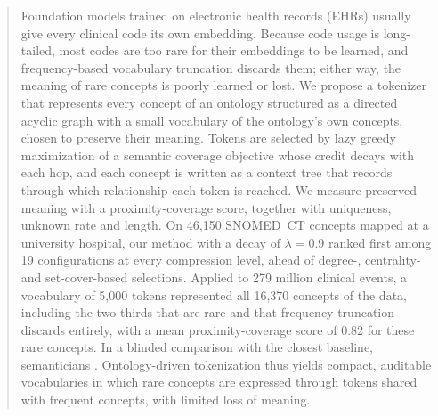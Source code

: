 \begin{abstract}
Foundation models trained on electronic health records (EHRs) usually give every clinical code its own embedding.
Because code usage is long-tailed, most codes are too rare for their embeddings to be learned, and frequency-based vocabulary truncation discards them; either way, the meaning of rare concepts is poorly learned or lost.
We propose a tokenizer that represents every concept of an ontology structured as a directed acyclic graph with a small vocabulary of the ontology's own concepts, chosen to preserve their meaning.
Tokens are selected by lazy greedy maximization of a semantic coverage objective whose credit decays with each hop, and each concept is written as a context tree that records through which relationship each token is reached.
We measure preserved meaning with a proximity-coverage score, together with uniqueness, unknown rate and length.
On 46,150 SNOMED~CT concepts mapped at a university hospital, our method with a decay of $\lambda = 0.9$ ranked first among 19 configurations at every compression level, ahead of degree-, centrality- and set-cover-based selections.
Applied to 279 million clinical events, a vocabulary of 5,000 tokens represented all 16,370 concepts of the data, including the two thirds that are rare and that frequency truncation discards entirely, with a mean proximity-coverage score of 0.82 for these rare concepts.
In a blinded comparison with the closest baseline, semanticians .
Ontology-driven tokenization thus yields compact, auditable vocabularies in which rare concepts are expressed through tokens shared with frequent concepts, with limited loss of meaning.
\end{abstract}

